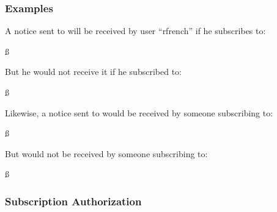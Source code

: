 \subsubsection{Examples}
\label{subscription-examples}

A notice sent to 
will be received by user ``rfrench'' if he subscribes to:

\ss
\begin{description}
\item {}
\item {}
\end{description}
\ess

\noindent But he would not receive it if he subscribed to:

\ss
\begin{description}
\item {}
\item {}
\item {}
\end{description}
\ess

Likewise, a notice sent to 
would be received by someone subscribing to:

\ss
\begin{description}
\item {}
\item {}
\end{description}
\ess

\noindent But would not be received by someone subscribing to:

\ss
\begin{description}
\item {}
\item {}
\end{description}
\ess

\subsubsection{Subscription Authorization}
\label{subscription-authorization}


